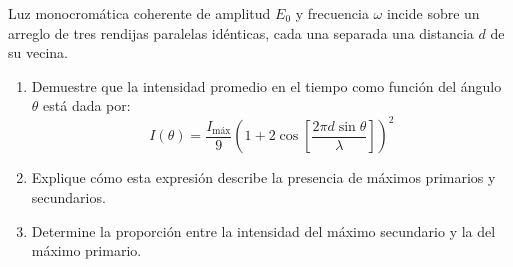 \item Luz monocromática coherente de amplitud $E_0$ y frecuencia $\omega$ incide sobre un arreglo de tres rendijas paralelas idénticas, cada una separada una distancia $d$ de su vecina.
\begin{enumerate}
    \item Demuestre que la intensidad promedio en el tiempo como función del ángulo $\theta$ está dada por:
    $$ I(\theta) = \frac{I_{\text{máx}}}{9} \left( 1 + 2\cos \left[ \frac{2\pi d \sin\theta}{\lambda} \right] \right)^2 $$
    \item Explique cómo esta expresión describe la presencia de máximos primarios y secundarios.
    \item Determine la proporción entre la intensidad del máximo secundario y la del máximo primario.
\end{enumerate}